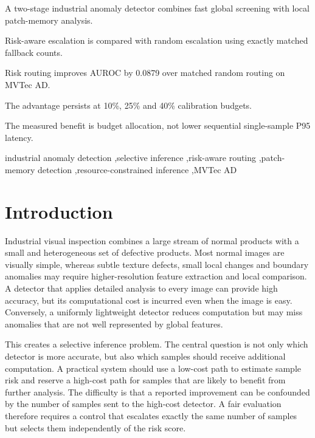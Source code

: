 \documentclass[preprint,12pt]{elsarticle}
\begin{document}
\begin{frontmatter}
\begin{highlights}
\item A two-stage industrial anomaly detector combines fast global screening with local patch-memory analysis.
\item Risk-aware escalation is compared with random escalation using exactly matched fallback counts.
\item Risk routing improves AUROC by 0.0879 over matched random routing on MVTec AD.
\item The advantage persists at 10\%, 25\% and 40\% calibration budgets.
\item The measured benefit is budget allocation, not lower sequential single-sample P95 latency.
\end{highlights}

\begin{keyword}
industrial anomaly detection \sep selective inference \sep risk-aware routing \sep patch-memory detection \sep resource-constrained inference \sep MVTec AD
\end{keyword}

\end{frontmatter}

\section{Introduction}

Industrial visual inspection combines a large stream of normal products with a small and heterogeneous set of defective products. Most normal images are visually simple, whereas subtle texture defects, small local changes and boundary anomalies may require higher-resolution feature extraction and local comparison. A detector that applies detailed analysis to every image can provide high accuracy, but its computational cost is incurred even when the image is easy. Conversely, a uniformly lightweight detector reduces computation but may miss anomalies that are not well represented by global features.

This creates a selective inference problem. The central question is not only which detector is more accurate, but also which samples should receive additional computation. A practical system should use a low-cost path to estimate sample risk and reserve a high-cost path for samples that are likely to benefit from further analysis. The difficulty is that a reported improvement can be confounded by the number of samples sent to the high-cost detector. A fair evaluation therefore requires a control that escalates exactly the same number of samples but selects them independently of the risk score.
\end{document}
